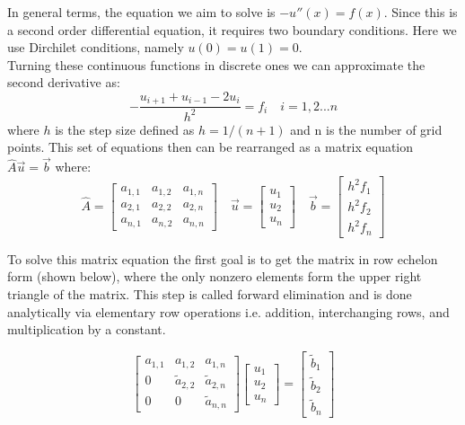 \documentclass[prc,amsmath,twocolumn,superscriptaddress]{revtex4}
\begin{document}
In general terms, the equation we aim to solve is $-u''(x)=f(x)$. Since this is a second order differential equation, it requires two boundary conditions. Here we use Dirchilet conditions, namely $u(0)=u(1)=0$. \\

Turning these continuous functions in discrete ones we can approximate the second derivative as:
\begin{equation}
-\frac{u_{i+1}+u_{i-1}-2u_i}{h^2}=f_i \quad i=1,2...n
\label{deriv}
\end{equation}
where $h$ is the step size defined as $h=1/(n+1)$ and n is the number of grid points. This set of equations then can be rearranged as a matrix equation $\hat{A}\vec{u}=\vec{b}$ where:
\begin{equation}
\hat{A}=\begin{bmatrix} a_{1,1} & a_{1,2} &a_{1,n} \\ a_{2,1}  & a_{2,2} &a_{2,n} \\ a_{n,1}  & a_{n,2}  &a_{n,n} \end{bmatrix}
\quad \vec{u}=\begin{bmatrix} u_1  \\ u_2\\ u_n \end{bmatrix} 
\quad \vec{b}=\begin{bmatrix} h^2f_1  \\ h^2f_2\\ h^2f_n \end{bmatrix}
\end{equation}

To solve this matrix equation the first goal is to get the matrix in row echelon form (shown below), where the only nonzero elements form the upper right triangle of the matrix. This step is called forward elimination and is done analytically via elementary row operations i.e. addition, interchanging rows, and multiplication by a constant.

\begin{equation}
\begin{bmatrix} a_{1,1} & a_{1,2} &a_{1,n} \\ 0  & \tilde{a}_{2,2} &\tilde{a}_{2,n} \\ 0  & 0  &\tilde{a}_{n,n} \end{bmatrix}
\begin{bmatrix} u_1  \\ u_2\\ u_n \end{bmatrix}=\begin{bmatrix} \tilde{b}_1  \\ \tilde{b}_2\\ \tilde{b}_n \end{bmatrix}
\label{reduced}
\end{equation}
\end{document}
